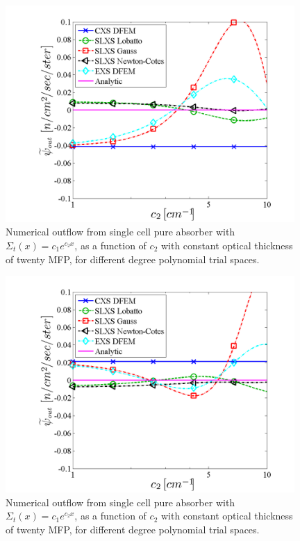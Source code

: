 \begin{figure}[!htp]
\centering
\includegraphics[width=11cm]{chapter3_variable_xs/Exp_outflow_p3.png}
\caption{Numerical outflow from single cell pure absorber with $\Sigma_t(x) = c_1e^{c_2 x}$, as a function of $c_2$ with constant optical thickness of twenty MFP, for different degree polynomial trial spaces.}
\label{fig:exp_outflow_p3}
\end{figure}
%
%
\begin{figure}[!hbp]
\centering
\includegraphics[width=11cm]{chapter3_variable_xs/Exp_outflow_p4.png}
\caption{Numerical outflow from single cell pure absorber with $\Sigma_t(x) = c_1e^{c_2 x}$, as a function of $c_2$ with constant optical thickness of twenty MFP, for different degree polynomial trial spaces.}
\label{fig:exp_outflow_p4}
\end{figure}
\pagebreak

